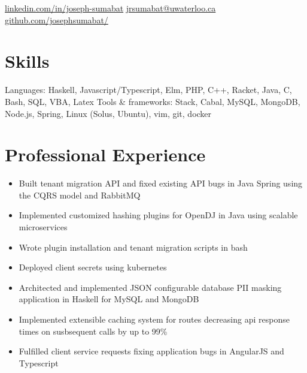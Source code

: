 \documentclass{simple_resume}
\begin{document}
{\href{https://www.linkedin.com/in/joseph-sumabat}{linkedin.com/in/joseph-sumabat}}
{\href{to:jrsumabat@uwaterloo.ca}{jrsumabat@uwaterloo.ca}}
{\href{https://github.com/josephsumabat/}{github.com/josephsumabat/}}

\section{Skills}
\resskillheading
    {Languages:}
    {Haskell, Javascript/Typescript, Elm, PHP, C++, Racket, Java, C, Bash, SQL, VBA, Latex}
    \resskillheading
    {Tools \& frameworks:}
    {Stack, Cabal, MySQL, MongoDB, Node.js, Spring, Linux (Solus, Ubuntu), vim, git, docker}

\section{Professional Experience}
\begin{itemize}
  \item Built tenant migration API and fixed existing API bugs in Java Spring using the CQRS model and RabbitMQ
  \item Implemented customized hashing plugins for OpenDJ in Java using scalable microservices
  \item Wrote plugin installation and tenant migration scripts in bash
  \item Deployed client secrets using kubernetes
\end{itemize}

\begin{itemize}
  \item{Architected and implemented JSON configurable database PII masking application in Haskell for MySQL and MongoDB}
  \item{Implemented extensible caching system for routes decreasing api response times on susbsequent calls by up to 99\%}
  \item{Fulfilled client service requests fixing application bugs in AngularJS and Typescript}
\end{itemize}
\end{document}
